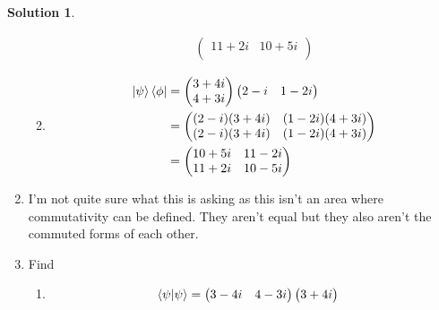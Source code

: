 \documentclass[10pt]{article}
\theoremstyle{definition}
\newtheorem{soln}{Solution}
\begin{document}
\begin{soln}
\begin{enumerate}[label=(\alph*)]
\begin{enumerate}[label=(\roman*)]
\begin{align*}
\begin{pmatrix}
                      11+2i & 10+5i \\
                    \end{pmatrix}
                  \end{align*}
            \item \begin{align*}
                    \ket{\psi}\bra{\phi} & =
                    \begin{pmatrix}
                      3+4i \\
                      4+3i
                    \end{pmatrix}
                    \begin{pmatrix}
                      2-i & 1-2i
                    \end{pmatrix}             \\
                                         & =
                    \begin{pmatrix}
                      (2-i)(3+4i) & (1-2i)(4+3i) \\
                      (2-i)(3+4i) & (1-2i)(4+3i) \\
                    \end{pmatrix} \\
                                         & =
                    \begin{pmatrix}
                      10+5i & 11-2i \\
                      11+2i & 10-5i \\
                    \end{pmatrix}
                  \end{align*}
          \end{enumerate}
    \item I'm not quite sure what this is asking as this isn't an area where commutativity can be defined. They aren't equal but they also aren't the commuted
          forms of each other.
    \item Find \begin{enumerate} [label=(\roman*)]
            \item \begin{align*}
                    \braket{\psi}{\psi} & =
                    \begin{pmatrix}
                      3-4i & 4-3i
                    \end{pmatrix}
                    \begin{pmatrix}
                      3+4i \\

\end{pmatrix}
\end{align*}
\end{enumerate}
\end{enumerate}
\end{soln}
\end{document}
